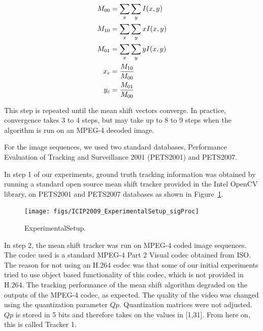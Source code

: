 \documentclass{article}
\begin{document}
\begin{align}
	\label{eq:MeanShiftEquations}
	M_{00}&=\sum_x\sum_yI(x,y)\notag\\
	M_{10}&=\sum_x\sum_yxI(x,y)\notag\\
	M_{01}&=\sum_x\sum_yyI(x,y)\\
	x_c&=\frac{M_{10}}{M_{00}}\notag \\
	y_c&=\frac{M_{01}}{M_{00}} \notag
\end{align}

This step is repeated until the mean shift vectors converge.  In practice, convergence takes 3 to 4 steps, but may take up to 8 to 9 steps when the algorithm is run on an MPEG-4 decoded image.  

For the image sequences, we used two standard databases, Performance Evaluation of Tracking and Surveillance 2001 (PETS2001) and PETS2007.  

In step 1 of our experiments, ground truth tracking information was obtained by running a standard open source mean shift tracker provided in the Intel OpenCV library, on PETS2001 and PETS2007 databases as shown in Figure~\ref{fig:ExperimentalSetup}.  

\begin{figure}[h]
			\centering
			\texttt{[image: figs/ICIP2009\_ExperimentalSetup\_sigProc]}
			\caption{ExperimentalSetup.}
			\label{fig:ExperimentalSetup}
\end{figure}

In step 2, the mean shift tracker was run on MPEG-4 coded image sequences.  The codec used is a standard MPEG-4 Part 2 Visual codec obtained from ISO.  The reason for not using an H.264 codec was that some of our initial experiments tried to use object based functionality of this codec, which is not provided in H.264.  The tracking performance of the mean shift algorithm degraded on the outputs of the MPEG-4 codec, as expected.  The quality of the video was changed using the quantization parameter $Qp$.  Quantization matrices were not adjusted.  $Qp$ is stored in 5 bits and therefore takes on the values in [1,31].  From here on, this is called Tracker 1.
\end{document}
